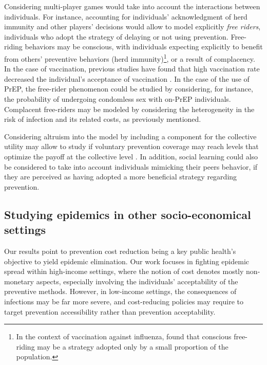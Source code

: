 Considering multi-player games would take into account the interactions between individuals. For instance, accounting for individuals' acknowledgment of herd immunity and other players' decisions would allow to model explicitly \textit{free riders}, individuals who adopt the strategy of delaying or not using prevention. Free-riding behaviors may be conscious, with individuals expecting explicitly to benefit from others' preventive behaviors (herd immunity)\footnote{In the context of vaccination against influenza, \cite{Parker2013} found that conscious free-riding may be a strategy adopted only by a small proportion of the population.}, or a result of complacency. In the case of vaccination, previous studies have found that high vaccination rate decreased the individual's acceptance of vaccination \cite[]{Ibuka2014}. In the case of the use of PrEP, the free-rider phenomenon could be studied by considering, for instance, the probability of undergoing condomless sex with on-PrEP individuals. Complacent free-riders may be modeled by considering the heterogeneity in the risk of infection and its related costs, as previously mentioned. 

Considering altruism into the model by including a component for the collective utility may allow to study if voluntary prevention coverage may reach levels that optimize the payoff at the collective level \cite[]{Shim2012}. In addition, social learning \cite[]{Bauch2012} could also be considered to take into account individuals mimicking their peers behavior, if they are perceived as having adopted a more beneficial strategy regarding prevention.


\subsection{Studying epidemics in other socio-economical settings}
Our results point to prevention cost reduction being a key public health's objective to yield epidemic elimination. Our work focuses in fighting epidemic spread within high-income settings, where the notion of cost denotes mostly non-monetary aspects, especially involving the individuals' acceptability of the preventive methods. However, in low-income settings, the consequences of infections may be far more severe, and cost-reducing policies may require to target prevention accessibility rather than prevention acceptability. 

